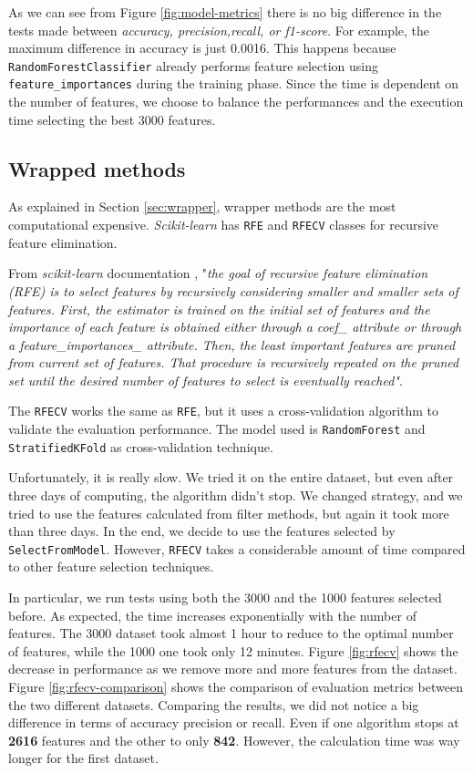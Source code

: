 As we can see from Figure \ref{fig:model-metrics} there is no big difference in the tests made between \textit{accuracy, precision,recall, or f1-score}. For example, the maximum difference in accuracy is just 0.0016. This happens because \texttt{RandomForestClassifier} already performs feature selection using \texttt{feature\_importances} during the training phase. Since the time is dependent on the number of features, we choose to balance the performances and the execution time selecting the best 3000 features.

\subsection{Wrapped methods}

As explained in Section \ref{sec:wrapper}, wrapper methods are the most computational expensive. \textit{Scikit-learn} has \texttt{RFE} and \texttt{RFECV} classes for recursive feature elimination. 

From \textit{scikit-learn} documentation \cite{rfe}, "\textit{the goal of recursive feature elimination (RFE) is to select features by recursively considering smaller and smaller sets of features. First, the estimator is trained on the initial set of features and the importance of each feature is obtained either through a coef\_ attribute or through a feature\_importances\_ attribute. Then, the least important features are pruned from current set of features. That procedure is recursively repeated on the pruned set until the desired number of features to select is eventually reached"}.

The \texttt{RFECV} works the same as \texttt{RFE}, but it uses a cross-validation algorithm to validate the evaluation performance.
The model used is \texttt{RandomForest} and \texttt{StratifiedKFold} as cross-validation technique.

Unfortunately, it is really slow. We tried it on the entire dataset, but even after three days of computing, the algorithm didn't stop. We changed strategy, and we tried to use the features calculated from filter methods, but again it took more than three days. In the end, we decide to use the features selected by \texttt{SelectFromModel}. However, \texttt{RFECV} takes a considerable amount of time compared to other feature selection techniques.

In particular, we run tests using both the 3000 and the 1000 features selected before. As expected, the time increases exponentially with the number of features. The 3000 dataset took almost 1 hour to reduce to the optimal number of features, while the 1000 one took only 12 minutes.  Figure \ref{fig:rfecv} shows the decrease in performance as we remove more and more features from the dataset. Figure \ref{fig:rfecv-comparison} shows the comparison of evaluation metrics between the two different datasets.
Comparing the results, we did not notice a big difference in terms of accuracy precision or recall. Even if one algorithm stops at \textbf{2616} features and the other to only \textbf{842}. However, the calculation time was way longer for the first dataset. 

